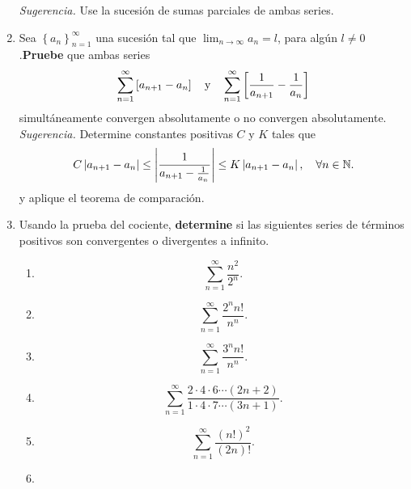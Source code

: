 \documentclass[12pt]{article}
\begin{document}
\begin{enumerate}
    \textit{Sugerencia.} Use la sucesión de sumas parciales de ambas series.
    \item Sea $\left\{a_n\right\}_{n=1}^{\infty}$ una sucesión tal que $\lim_{n\rightarrow\infty}a_n=l$, para algún $l\neq0$.\textbf{Pruebe} que ambas series
    \begin{equation*}
        \sum_{n=1}^{\infty}\left[a_{n+1}-a_n\right]\quad\textup{y}\quad\sum_{n=1}^{\infty}\left[\frac{1}{a_{n+1}}-\frac{1}{a_n}\right]
    \end{equation*}
    simultáneamente convergen absolutamente o no convergen absolutamente.
    \textit{Sugerencia.} Determine constantes positivas $C$ y $K$ tales que
    \begin{equation*}
        C\left| a_{n+1}-a_n \right|\leq \left| \frac{1}{a_{n+1}-\frac{1}{a_n}} \right|\leq K\left| a_{n+1}-a_{n} \right|, \quad\forall n\in\mathbb{N}.
    \end{equation*}
    y aplique el teorema de comparación.
    \item Usando la prueba del cociente, \textbf{determine} si las siguientes series de términos positivos son convergentes o divergentes a infinito.
    \begin{multicols}{2}
        \begin{enumerate}
            \item \begin{equation*}
                \sum_{n=1}^{\infty}\frac{n^2}{2^n}.
            \end{equation*}
            \item \begin{equation*}
                \sum_{n=1}^{\infty}\frac{2^nn!}{n^n}.
            \end{equation*}
            \item \begin{equation*}
                \sum_{n=1}^{\infty}\frac{3^nn!}{n^n}.
            \end{equation*}
            \item \begin{equation*}
                \sum_{n=1}^{\infty}\frac{2\cdot4\cdot6\cdots(2n+2)}{1\cdot4\cdot7\cdots(3n+1)}.
            \end{equation*}
            \item \begin{equation*}
                \sum_{n=1}^{\infty}\frac{(n!)^2}{(2n)!}.
            \end{equation*}
            \item \begin{equation*}

\end{equation*}
\end{enumerate}
\end{multicols}
\end{enumerate}
\end{document}
